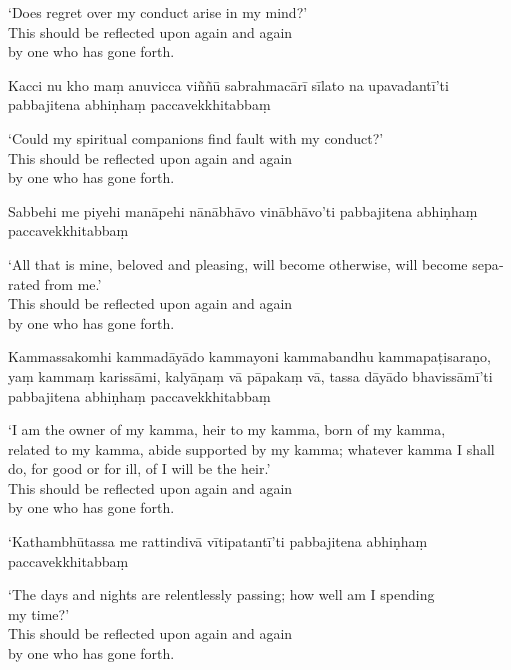 \begin{english}
  `Does regret over my conduct arise in my mind?'\\
  This should be reflected upon again and again\\
  by one who has gone forth.
\end{english}

Kacci nu kho maṃ anuvicca viññū sabrahmacārī sīlato na upavadantī'ti pabbajitena abhiṇhaṃ paccavekkhitabbaṃ

\begin{english}
  `Could my spiritual companions find fault with my conduct?'\\
  This should be reflected upon again and again\\
  by one who has gone forth.
\end{english}

Sabbehi me piyehi manāpehi nānābhāvo vinābhāvo'ti pabbajitena abhiṇhaṃ paccavekkhitabbaṃ

\begin{english}
  `All that is mine, beloved and pleasing, will become otherwise, will become separated from me.'\\
  This should be reflected upon again and again\\
  by one who has gone forth.
\end{english}

Kammassakomhi kammadāyādo kammayoni kammabandhu kammapaṭisaraṇo, yaṃ kammaṃ karissāmi, kalyāṇaṃ vā pāpakaṃ vā, tassa dāyādo bhavissāmī'ti pabbajitena abhiṇhaṃ paccavekkhitabbaṃ

\begin{english}
  `I am the owner of my kamma, heir to my kamma, born of my kamma,\\
  related to my kamma, abide supported by my kamma; whatever kamma I shall do, for good or for ill, of  I will be the heir.'\\
  This should be reflected upon again and again\\
  by one who has gone forth.
\end{english}

\clearpage

`Kathambhūtassa me rattindivā vītipatantī'ti pabbajitena abhiṇhaṃ paccavekkhitabbaṃ

\begin{english}
  `The days and nights are relentlessly passing; how well am I spending\\ my time?'\\
  This should be reflected upon again and again\\
  by one who has gone forth.
\end{english}

